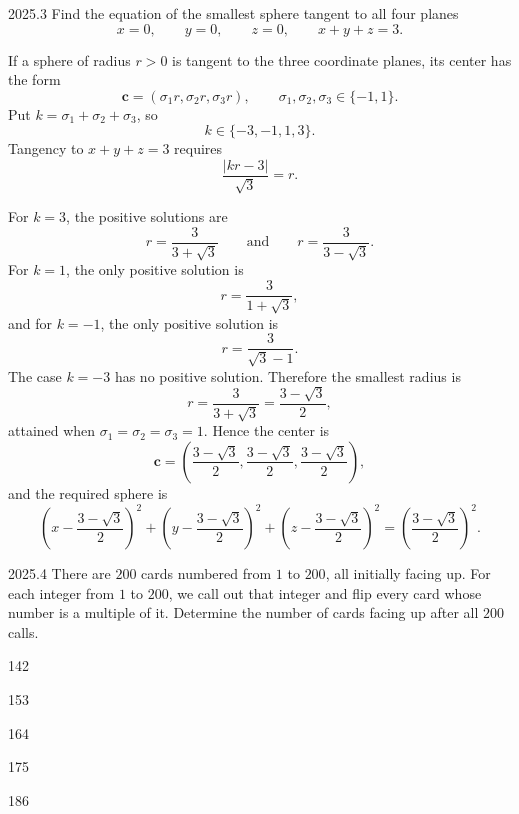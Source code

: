     \begin{pastproblem}{2025.3}
        Find the equation of the smallest sphere tangent to all four planes
        \[
            x=0,\qquad y=0,\qquad z=0,\qquad x+y+z=3.
        \]
    \end{pastproblem}

    \begin{solution}
        If a sphere of radius $r>0$ is tangent to the three coordinate planes,
        its center has the form
        \[
            \mathbf{c}=(\sigma_1r,\sigma_2r,\sigma_3r),
            \qquad
            \sigma_1,\sigma_2,\sigma_3\in\{-1,1\}.
        \]
        Put $k=\sigma_1+\sigma_2+\sigma_3$, so
        \[
            k\in\{-3,-1,1,3\}.
        \]
        Tangency to $x+y+z=3$ requires
        \[
            \frac{|kr-3|}{\sqrt3}=r.
        \]

        For $k=3$, the positive solutions are
        \[
            r=\frac{3}{3+\sqrt3}
            \qquad\text{and}\qquad
            r=\frac{3}{3-\sqrt3}.
        \]
        For $k=1$, the only positive solution is
        \[
            r=\frac{3}{1+\sqrt3},
        \]
        and for $k=-1$, the only positive solution is
        \[
            r=\frac{3}{\sqrt3-1}.
        \]
        The case $k=-3$ has no positive solution. Therefore the smallest
        radius is
        \[
            r=\frac{3}{3+\sqrt3}
            =\frac{3-\sqrt3}{2},
        \]
        attained when $\sigma_1=\sigma_2=\sigma_3=1$. Hence the center is
        \[
            \mathbf{c}
            =
            \left(
                \frac{3-\sqrt3}{2},
                \frac{3-\sqrt3}{2},
                \frac{3-\sqrt3}{2}
            \right),
        \]
        and the required sphere is
        \[
            \boxed{
            \left(x-\frac{3-\sqrt3}{2}\right)^2
            +
            \left(y-\frac{3-\sqrt3}{2}\right)^2
            +
            \left(z-\frac{3-\sqrt3}{2}\right)^2
            =
            \left(\frac{3-\sqrt3}{2}\right)^2
            }.
        \]
    \end{solution}

    \begin{pastproblem}{2025.4}
        There are $200$ cards numbered from $1$ to $200$, all initially facing up. For each integer
        from $1$ to $200$, we call out that integer and flip every card whose number is a multiple
        of it. Determine the number of cards facing up after all $200$ calls.
        \begin{problemchoices}
            \item 142
            \item 153
            \item 164
            \item 175
            \item 186
        \end{problemchoices}
    \end{pastproblem}

